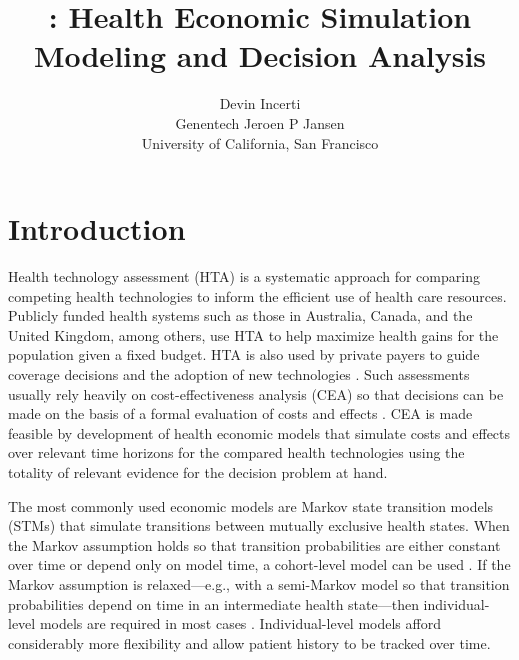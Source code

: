 \documentclass[article, nojss]{jss}\usepackage[]{graphicx}\usepackage[]{color}
\author{Devin Incerti\\Genentech
   \And Jeroen P Jansen\\University of California, San Francisco}
\title{\pkg{hesim}: Health Economic Simulation Modeling and Decision Analysis}
\begin{document}


\section{Introduction} \label{sec:intro}
Health technology assessment (HTA) is a systematic approach for comparing competing health technologies to inform the efficient use of health care resources. Publicly funded health systems such as those in Australia, Canada, and the United Kingdom, among others, use HTA to help maximize health gains for the population given a fixed budget. HTA is also used by private payers to guide coverage decisions and the adoption of new technologies \citep{trosman2011health}. Such assessments usually rely heavily on cost-effectiveness analysis (CEA) so that decisions can be made on the basis of a formal evaluation of costs and effects \citep{dakin2015influence}. CEA is made feasible by development of health economic models that simulate costs and effects over relevant time horizons for the compared health technologies using the totality of relevant evidence for the decision problem at hand. 

The most commonly used economic models are Markov state transition models (STMs) that simulate transitions between mutually exclusive health states. When the Markov assumption holds so that transition probabilities are either constant over time or depend only on model time, a cohort-level model can be used \citep{briggs1998introduction}. If the Markov assumption is relaxed---e.g., with a semi-Markov model so that transition probabilities depend on time in an intermediate health state---then individual-level models are required in most cases \citep{brennan2006taxonomy, fiocco2008reduced}. Individual-level models afford considerably more flexibility and allow patient history to be tracked over time.
\end{document}
